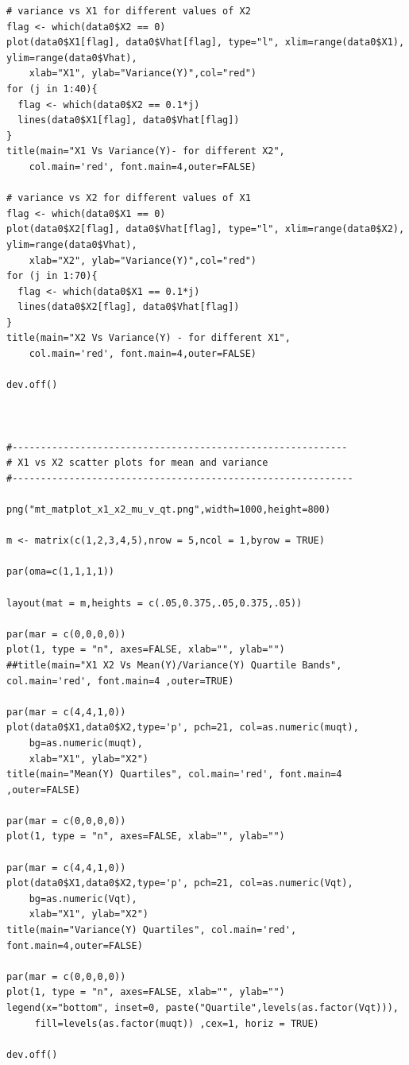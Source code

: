 \documentclass[twoside,12pt]{article}
\begin{document}
\begin{verbatim}
# variance vs X1 for different values of X2
flag <- which(data0$X2 == 0)
plot(data0$X1[flag], data0$Vhat[flag], type="l", xlim=range(data0$X1), ylim=range(data0$Vhat),
	xlab="X1", ylab="Variance(Y)",col="red")
for (j in 1:40){
  flag <- which(data0$X2 == 0.1*j)
  lines(data0$X1[flag], data0$Vhat[flag])
}
title(main="X1 Vs Variance(Y)- for different X2",
	col.main='red', font.main=4,outer=FALSE)

# variance vs X2 for different values of X1
flag <- which(data0$X1 == 0)
plot(data0$X2[flag], data0$Vhat[flag], type="l", xlim=range(data0$X2), ylim=range(data0$Vhat),
	xlab="X2", ylab="Variance(Y)",col="red")
for (j in 1:70){
  flag <- which(data0$X1 == 0.1*j)
  lines(data0$X2[flag], data0$Vhat[flag])
}
title(main="X2 Vs Variance(Y) - for different X1",
	col.main='red', font.main=4,outer=FALSE)

dev.off()



#-----------------------------------------------------------
# X1 vs X2 scatter plots for mean and variance
#------------------------------------------------------------

png("mt_matplot_x1_x2_mu_v_qt.png",width=1000,height=800)

m <- matrix(c(1,2,3,4,5),nrow = 5,ncol = 1,byrow = TRUE)

par(oma=c(1,1,1,1))

layout(mat = m,heights = c(.05,0.375,.05,0.375,.05))

par(mar = c(0,0,0,0))
plot(1, type = "n", axes=FALSE, xlab="", ylab="")
##title(main="X1 X2 Vs Mean(Y)/Variance(Y) Quartile Bands", col.main='red', font.main=4 ,outer=TRUE)

par(mar = c(4,4,1,0))
plot(data0$X1,data0$X2,type='p', pch=21, col=as.numeric(muqt), 
	bg=as.numeric(muqt),
	xlab="X1", ylab="X2")
title(main="Mean(Y) Quartiles", col.main='red', font.main=4 ,outer=FALSE)

par(mar = c(0,0,0,0))
plot(1, type = "n", axes=FALSE, xlab="", ylab="")

par(mar = c(4,4,1,0))
plot(data0$X1,data0$X2,type='p', pch=21, col=as.numeric(Vqt), 
	bg=as.numeric(Vqt),
	xlab="X1", ylab="X2")
title(main="Variance(Y) Quartiles", col.main='red', font.main=4,outer=FALSE)

par(mar = c(0,0,0,0))
plot(1, type = "n", axes=FALSE, xlab="", ylab="")
legend(x="bottom", inset=0, paste("Quartile",levels(as.factor(Vqt))),
	 fill=levels(as.factor(muqt)) ,cex=1, horiz = TRUE)

dev.off()





\end{verbatim}
\end{document}
